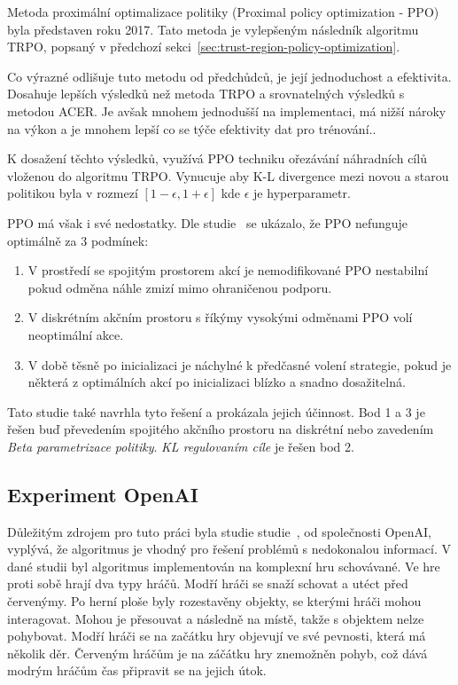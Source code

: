 
Metoda proximální optimalizace politiky (Proximal policy optimization - PPO) byla představen roku 2017\cite{PPO_paper}.
Tato metoda je vylepšeným následník algoritmu TRPO, popsaný v předchozí sekci~\ref{sec:trust-region-policy-optimization}.

Co výrazné odlišuje tuto metodu od předchůdců, je její jednoduchost a efektivita.
Dosahuje lepších výsledků než metoda TRPO a srovnatelných výsledků s metodou ACER.
Je avšak mnohem jednodušší na implementaci, má nižší nároky na výkon a je mnohem lepší co se týče efektivity dat pro trénování.\cite{PPO_paper}.

K dosažení těchto výsledků, využívá PPO techniku ořezávání náhradních cílů vloženou do algoritmu TRPO\@.
Vynucuje aby K-L divergence mezi novou a starou politikou byla v rozmezí $[1-\epsilon, 1+\epsilon]$ kde $\epsilon$ je hyperparametr.

PPO má však i své nedostatky.
\label{PPO_weakness}
Dle studie~\cite{PPO_weakness} se ukázalo, že PPO nefunguje optimálně za 3 podmínek:
\begin{enumerate}
  \item V prostředí se spojitým prostorem akcí je nemodifikované PPO nestabilní pokud odměna náhle zmizí mimo ohraničenou podporu.
  \item V diskrétním akčním prostoru s říkýmy vysokými odměnami PPO volí neoptimální akce.
  \item V době těsně po inicializaci je náchylné k předčasné volení strategie, pokud je některá z optimálních akcí po inicializaci blízko a snadno dosažitelná.
\end{enumerate}

Tato studie také navrhla tyto řešení a prokázala jejich účinnost.
Bod 1 a 3 je řešen buď převedením spojitého akčního prostoru na diskrétní nebo zavedením \emph{Beta parametrizace politiky}.
\emph{KL regulovaním cíle} je řešen bod 2.

\subsection{Experiment OpenAI}\label{subsec:experiment-openai}
Důležitým zdrojem pro tuto práci byla studie studie~\cite{PPO_Hide_Seek_paper}, od společnosti OpenAI, vyplývá, že algoritmus je vhodný pro řešení problémů s nedokonalou informací.
V dané studii byl algoritmus implementován na komplexní hru schovávané.
Ve hre proti sobě hrají dva typy hráčů.
Modří hráči se snaží schovat a utéct před červenýmy.
Po herní ploše byly rozestavěny objekty, se kterými hráči mohou interagovat.
Mohou je přesouvat a následně  na místě, takže s objektem nelze pohybovat.
Modří hráči se na začátku hry objevují ve své pevnosti, která má několik děr.
Červeným hráčům je na záčátku hry znemožněn pohyb, což dává modrým hráčům čas připravit se na jejich útok.

